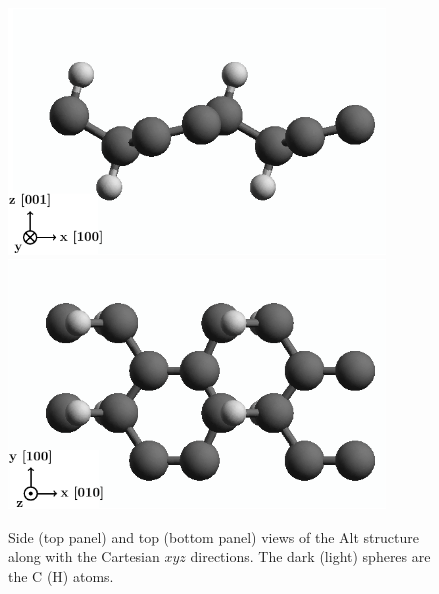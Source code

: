 \documentclass[floatfix,prb,aps,superscriptaddress,showpacs,11pt,preprint,letterpaper]{revtex4}
\def\tama{10cm}
\begin{document}
\begin{figure}[ht!]
    \centering
    \includegraphics[width=\tama]{figures/altstruc2}
    \\
    \includegraphics[width=\tama]{figures/altstruc1}
    \caption{Side (top panel) and top (bottom panel) views of the Alt
      structure along with the 
      Cartesian $xyz$ directions. The dark (light) spheres are the C (H) atoms.
}
    \label{fig:alt-struc}
\end{figure}
\end{document}
